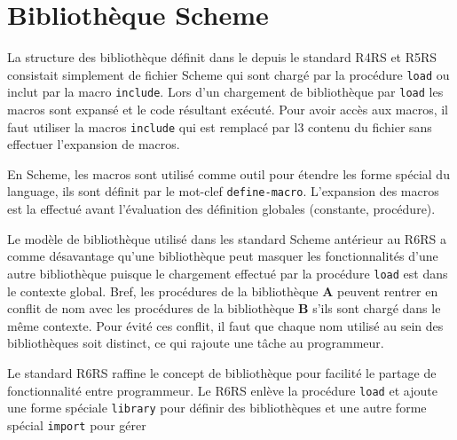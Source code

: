 
\chapter{Bibliothèque Scheme}
La structure des bibliothèque définit dans le depuis le standard
R4RS\cite{Scheme:R4RS} et R5RS\cite{Scheme:R5RS} consistait simplement de
fichier Scheme qui sont chargé par la procédure \texttt{load} ou inclut par la
macro \texttt{include}.  Lors d'un chargement de bibliothèque par \texttt{load}
les macros sont expansé et le code résultant exécuté. Pour avoir accès aux
macros, il faut utiliser la macros \texttt{include} qui est remplacé par l3
contenu du fichier sans effectuer l'expansion de macros.

En Scheme, les macros sont utilisé comme outil pour étendre les forme spécial du
language, ils sont définit par le mot-clef
\texttt{define-macro}. L'expansion des macros est la effectué avant
l'évaluation des définition globales (constante, procédure).


Le modèle de bibliothèque utilisé dans les standard Scheme antérieur au
R6RS\cite{Scheme:R6RS} a comme désavantage qu'une bibliothèque peut masquer les
fonctionnalités d'une autre bibliothèque puisque le chargement effectué par la
procédure \texttt{load} est dans le contexte global. Bref, les procédures de la
bibliothèque \textbf{A} peuvent rentrer en conflit de nom avec les procédures
de la bibliothèque \textbf{B} s'ils sont chargé dans le même contexte.  Pour
évité ces conflit, il faut que chaque nom utilisé au sein des bibliothèques
soit distinct, ce qui rajoute une tâche au programmeur.

Le standard R6RS raffine le concept de bibliothèque pour facilité le partage
de fonctionnalité entre programmeur. Le R6RS enlève la procédure \texttt{load} et
ajoute une forme spéciale \texttt{library} pour définir des bibliothèques et une autre
forme spécial \texttt{import} pour gérer


